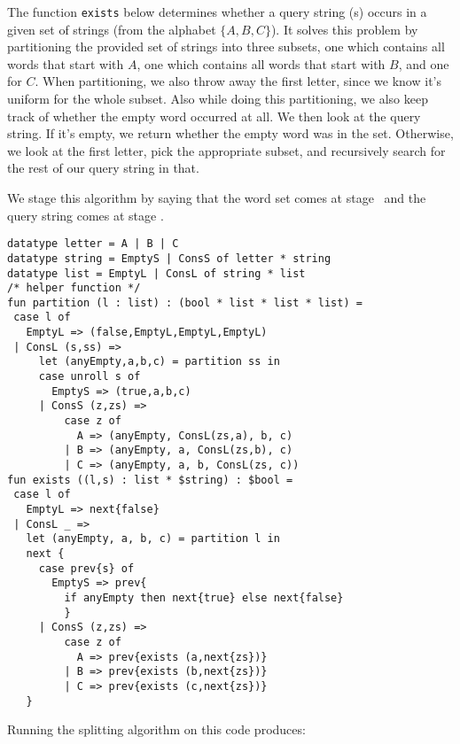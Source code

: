 The function {\tt exists} below determines whether a query string (s) occurs in a given set of strings (from the alphabet $\{A, B,C\}$).
It solves this problem by partitioning the provided set of strings into three subsets,
one which contains all words that start with $A$,
one which contains all words that start with $B$, and one for $C$.
When partitioning, we also throw away the first letter, since we know it's uniform for the whole subset.
Also while doing this partitioning, we also keep track of whether the empty word occurred at all.
We then look at the query string.  If it's empty, we return whether the empty word was in the set.
Otherwise, we look at the first letter, pick the appropriate subset, 
and recursively search for the rest of our query string in that.

We stage this algorithm by saying that the word set comes at stage \bbone\
and the query string comes at stage \bbtwo.

\begin{lstlisting} 
datatype letter = A | B | C
datatype string = EmptyS | ConsS of letter * string
datatype list = EmptyL | ConsL of string * list
/* helper function */
fun partition (l : list) : (bool * list * list * list) =
 case l of
   EmptyL => (false,EmptyL,EmptyL,EmptyL)
 | ConsL (s,ss) =>
     let (anyEmpty,a,b,c) = partition ss in
     case unroll s of
       EmptyS => (true,a,b,c)
     | ConsS (z,zs) =>
         case z of 
           A => (anyEmpty, ConsL(zs,a), b, c) 
         | B => (anyEmpty, a, ConsL(zs,b), c) 
         | C => (anyEmpty, a, b, ConsL(zs, c))
fun exists ((l,s) : list * $string) : $bool =
 case l of 
   EmptyL => next{false} 
 | ConsL _ => 
   let (anyEmpty, a, b, c) = partition l in
   next {
     case prev{s} of
       EmptyS => prev{
         if anyEmpty then next{true} else next{false}
         }
     | ConsS (z,zs) =>
         case z of
           A => prev{exists (a,next{zs})}
         | B => prev{exists (b,next{zs})} 
         | C => prev{exists (c,next{zs})}
   }
\end{lstlisting}

\noindent
Running the splitting algorithm on this code produces:

